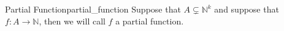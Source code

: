 \begin{definition}{Partial Function}{partial_function}
Suppose that $A \subsetneq \mathbb{N}^{k}$ and suppose that $f: A \rightarrow \mathbb{N}$, then we will call $f$ a partial function.
\end{definition}
